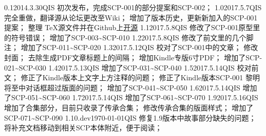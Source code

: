 


\begin{versionhistory}
\vhEntry
{0.1}{2014.3.30}{QIS}{
	初次发布，完成SCP-001的部分提案和SCP-002；
}
\vhEntry
{1.0}{2017.5.7}{QIS}{
	完全重做，翻译源从论坛更改至Wiki；
	增加了版本历史，更新新加入的SCP-001提案；
	整理 \TeX 源文件并在Github上\href{https://github.com/7sDream/scp-pdf}{开源}
}
\vhEntry
{1.1}{2017.5.8}{QIS}{
	修改了SCP-001原型里的符号错误；
	增加了SCP-003\textasciitilde SCP-010
}
\vhEntry
{1.2}{2017.5.8}{QIS}{
	修改了前文里的几个脚注；
	增加了SCP-011\textasciitilde SCP-020
}
\vhEntry
{1.3}{2017.5.12}{QIS}{
	校对了SCP-001中的文章；
	修改封面；
	去除生成PDF文章标题上的间隔；
	增加Kindle专版6寸PDF；
	增加了SCP-021\textasciitilde SCP-030
}
\vhEntry
{1.4}{2017.5.13}{QIS}{
    增加了SCP-031\textasciitilde SCP-040
}
\vhEntry
{1.5}{2017.5.14}{QIS}{
    校对前文；
    修正了Kindle版本上文字上方注释的问题；
    修正了Kindle版本SCP-001 黎明将至中对话框超过版面的问题；
    增加了SCP-041\textasciitilde SCP-050
}
\vhEntry
{1.6}{2017.5.14}{QIS}{
    增加了SCP-051\textasciitilde SCP-060
}
\vhEntry
{1.7}{2017.5.14}{QIS}{
    增加了SCP-061\textasciitilde SCP-070
}
\vhEntry
{1.9}{2017.5.16}{QIS}{
    增加了合集部分，目前只收录了传承合集；
    修改传承合集的版面样式；
    增加了SCP-071\textasciitilde SCP-090
}
\vhEntry
{1.10.dev}{\today}{QIS}{
    修复1.9版本中故事部分缺失的问题；
    将补充文档移动到相关SCP本体附近，便于阅读；
}
\end{versionhistory}
